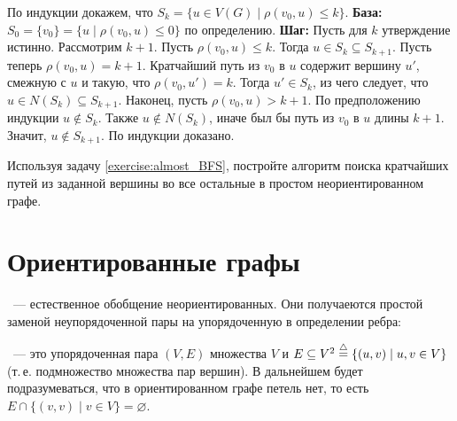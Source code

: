 \begin{Answer}
    \noindent

    По индукции докажем, что $ S_k = \{ u \in V(G) \mid \rho(v_0, u) \leqslant k \} $.
    \newline
    \textbf{База:}
    $ S_0 = \{ v_0 \} = \{ u \mid \rho(v_0, u) \leqslant 0 \} $ по определению.
    \newline
    \textbf{Шаг:}
    Пусть для $ k $ утверждение истинно.
    Рассмотрим $ k + 1 $.
    Пусть $ \rho(v_0, u) \leqslant k $.
    Тогда $ u \in S_k \subseteq S_{k+1} $.
    Пусть теперь $ \rho(v_0, u) = k + 1 $.
    Кратчайший путь из $ v_0 $ в $ u $ содержит вершину $ u' $, смежную с $ u $ и такую, что $ \rho(v_0, u') = k $.
    Тогда $ u' \in S_k $, из чего следует, что $ u \in N(S_k) \subseteq S_{k+1} $.
    Наконец, пусть $ \rho(v_0, u) > k + 1 $.
    По предположению индукции $ u \notin S_k $.
    Также $ u \notin N(S_k) $, иначе был бы путь из $ v_0 $ в $ u $ длины $ k + 1 $.
    Значит, $ u \notin S_{k+1} $.
    \newline
    По индукции доказано.

\end{Answer}

\begin{Exercise}[counter=SecExercise]
    \noindent
    Используя задачу \ref{exercise:almost_BFS}, постройте алгоритм поиска кратчайших путей из заданной вершины во все остальные в простом неориентированном графе.
\end{Exercise}



\newpage



\section{Ориентированные графы}
\label{sec:oriented_graphs}

~--- естественное обобщение неориентированных.
Они получаеются простой заменой неупорядоченной пары на упорядоченную в определении ребра:
\begin{definition}
    ~--- это упорядоченная пара $ (V, E) $ множества  $ V $
    и  $ E \subseteq V^2 \overset{\triangle}{=} \{ (u, v) \mid u, v \in V \} $ (т.\,е. подмножество множества пар вершин).
    В дальнейшем будет подразумеваться, что в ориентированном графе петель нет, то есть $ E \cap \{(v, v) \mid v \in V \} = \varnothing $.
\end{definition}

